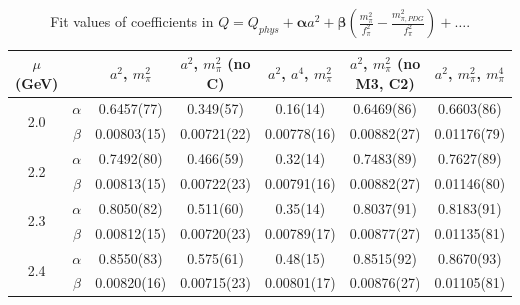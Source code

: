 \documentclass[12pt]{extarticle}
\begin{document}
\begin{table}[h!]
\begin{center}
\begin{tabular}{|c c|c|c|c|c|c|}
\hline
$\mu$ (GeV) &  & $a^2$, $m_\pi^2$& $a^2$, $m_\pi^2$ (no C)& $a^2$, $a^4$, $m_\pi^2$& $a^2$, $m_\pi^2$ (no M3, C2)& $a^2$, $m_\pi^2$, $m_\pi^4$\\
\hline
\multirow{2}{0.5in}{2.0} & $\alpha$ & 0.6457(77)& 0.349(57)& 0.16(14)& 0.6469(86)& 0.6603(86)\\
 & $\beta$ & 0.00803(15)& 0.00721(22)& 0.00778(16)& 0.00882(27)& 0.01176(79)\\
\hline
\multirow{2}{0.5in}{2.2} & $\alpha$ & 0.7492(80)& 0.466(59)& 0.32(14)& 0.7483(89)& 0.7627(89)\\
 & $\beta$ & 0.00813(15)& 0.00722(23)& 0.00791(16)& 0.00882(27)& 0.01146(80)\\
\hline
\multirow{2}{0.5in}{2.3} & $\alpha$ & 0.8050(82)& 0.511(60)& 0.35(14)& 0.8037(91)& 0.8183(91)\\
 & $\beta$ & 0.00812(15)& 0.00720(23)& 0.00789(17)& 0.00877(27)& 0.01135(81)\\
\hline
\multirow{2}{0.5in}{2.4} & $\alpha$ & 0.8550(83)& 0.575(61)& 0.48(15)& 0.8515(92)& 0.8670(93)\\
 & $\beta$ & 0.00820(16)& 0.00715(23)& 0.00801(17)& 0.00876(27)& 0.01105(81)\\
\hline
\end{tabular}
\caption{Fit values of coefficients in $Q = Q_{phys} + \mathbf{\alpha} a^2 + \mathbf{\beta}\left(\frac{m_\pi^2}{f_\pi^2}-\frac{m_{\pi,PDG}^2}{f_\pi^2}\right) + \ldots$.}
\end{center}
\end{table}




















\clearpage
\end{document}
